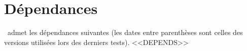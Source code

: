 \section{Dépendances}

\thisproj\ admet les dépendances suivantes (les dates entre parenthèses sont celles des versions utilisées lors des derniers tests).
<<DEPENDS>>
